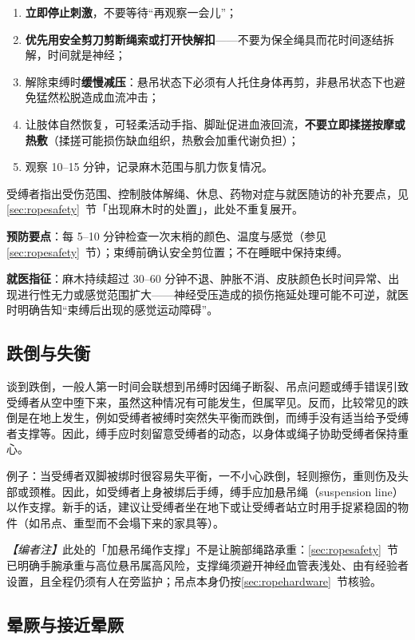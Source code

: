 \documentclass[12pt,UTF8]{ctexbook}
\begin{document}
\begin{enumerate}
\item \textbf{立即停止刺激}，不要等待“再观察一会儿”；
\item \textbf{优先用安全剪刀剪断绳索或打开快解扣}——不要为保全绳具而花时间逐结拆解，时间就是神经；
\item 解除束缚时\textbf{缓慢减压}：悬吊状态下必须有人托住身体再剪，非悬吊状态下也避免猛然松脱造成血流冲击；
\item 让肢体自然恢复，可轻柔活动手指、脚趾促进血液回流，\textbf{不要立即揉搓按摩或热敷}（揉搓可能损伤缺血组织，热敷会加重代谢负担）；
\item 观察 10--15 分钟，记录麻木范围与肌力恢复情况。
\end{enumerate}

受缚者指出受伤范围、控制肢体解绳、休息、药物对症与就医随访的补充要点，见\ref{sec:ropesafety}~节「出现麻木时的处置」，此处不重复展开。

\textbf{预防要点}：每 5--10 分钟检查一次末梢的颜色、温度与感觉（参见\ref{sec:ropesafety}~节）；束缚前确认安全剪位置；不在睡眠中保持束缚。

\textbf{就医指征}：麻木持续超过 30--60 分钟不退、肿胀不消、皮肤颜色长时间异常、出现进行性无力或感觉范围扩大——神经受压造成的损伤拖延处理可能不可逆，就医时明确告知“束缚后出现的感觉运动障碍”。

\subsection{跌倒与失衡}

谈到跌倒，一般人第一时间会联想到吊缚时因绳子断裂、吊点问题或缚手错误引致受缚者从空中堕下来，虽然这种情况有可能发生，但属罕见。反而，比较常见的跌倒是在地上发生，例如受缚者被缚时突然失平衡而跌倒，而缚手没有适当给予受缚者支撑等。因此，缚手应时刻留意受缚者的动态，以身体或绳子协助受缚者保持重心。

例子：当受缚者双脚被绑时很容易失平衡，一不小心跌倒，轻则擦伤，重则伤及头部或颈椎。因此，如受缚者上身被绑后手缚，缚手应加悬吊绳（suspension line）以作支撑。新手的话，建议让受缚者坐在地下或让受缚者站立时用手捉紧稳固的物件（如吊点、重型而不会塌下来的家具等）。

\noindent\textit{【编者注】}此处的「加悬吊绳作支撑」不是让腕部绳路承重：\ref{sec:ropesafety}~节已明确手腕承重与高位悬吊属高风险，支撑绳须避开神经血管表浅处、由有经验者设置，且全程仍须有人在旁监护；吊点本身仍按\ref{sec:ropehardware}~节核验。

\subsection{晕厥与接近晕厥}
\end{document}

